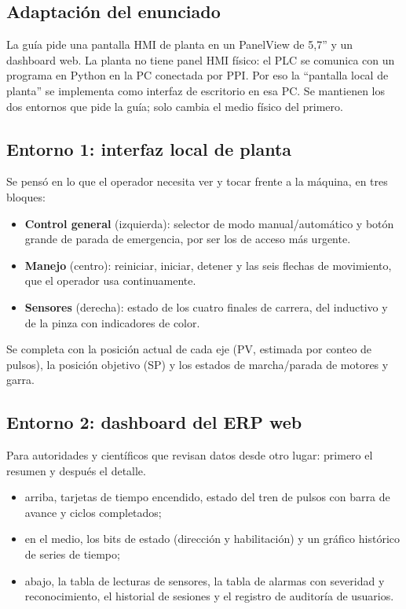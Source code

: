 \documentclass[a4paper,11pt]{article}
\begin{document}
\subsection{Adaptación del enunciado}
La guía pide una pantalla HMI de planta en un PanelView de 5,7'' y un dashboard web. La planta no tiene panel HMI físico: el PLC se comunica con un programa en Python en la PC conectada por PPI. Por eso la ``pantalla local de planta'' se implementa como interfaz de escritorio en esa PC. Se mantienen los dos entornos que pide la guía; solo cambia el medio físico del primero.

\subsection{Entorno 1: interfaz local de planta}
Se pensó en lo que el operador necesita ver y tocar frente a la máquina, en tres bloques:
\begin{itemize}
\item \textbf{Control general} (izquierda): selector de modo manual/automático y botón grande de parada de emergencia, por ser los de acceso más urgente.
\item \textbf{Manejo} (centro): reiniciar, iniciar, detener y las seis flechas de movimiento, que el operador usa continuamente.
\item \textbf{Sensores} (derecha): estado de los cuatro finales de carrera, del inductivo y de la pinza con indicadores de color.
\end{itemize}
Se completa con la posición actual de cada eje (PV, estimada por conteo de pulsos), la posición objetivo (SP) y los estados de marcha/parada de motores y garra.

\subsection{Entorno 2: dashboard del ERP web}
Para autoridades y científicos que revisan datos desde otro lugar: primero el resumen y después el detalle.
\begin{itemize}
\item arriba, tarjetas de tiempo encendido, estado del tren de pulsos con barra de avance y ciclos completados;
\item en el medio, los bits de estado (dirección y habilitación) y un gráfico histórico de series de tiempo;
\item abajo, la tabla de lecturas de sensores, la tabla de alarmas con severidad y reconocimiento, el historial de sesiones y el registro de auditoría de usuarios.
\end{itemize}
\end{document}
